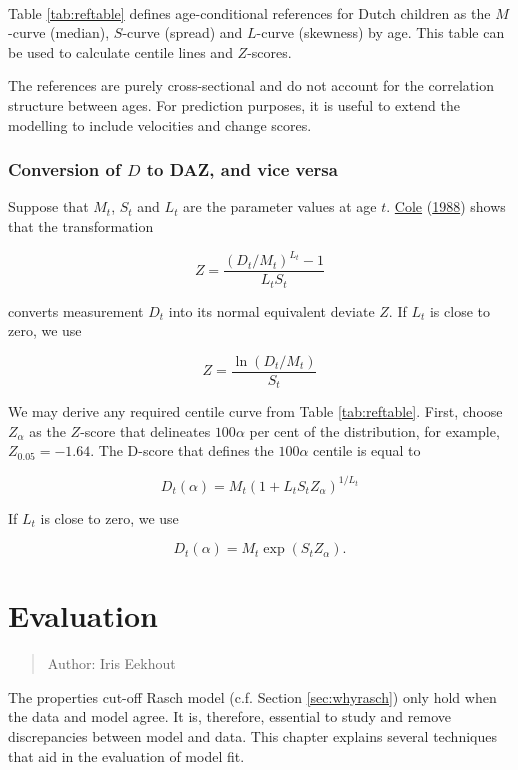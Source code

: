 \documentclass[
]{book}
\begin{document}
~

Table \ref{tab:reftable} defines age-conditional references for Dutch children as the \(M\)-curve (median), \(S\)-curve (spread) and \(L\)-curve (skewness) by age. This table can be used to calculate centile lines and \(Z\)-scores.

The references are purely cross-sectional and do not account for the correlation structure between ages. For prediction purposes, it is useful to extend the modelling to include velocities and change scores.

\hypertarget{conversion-of-d-to-daz-and-vice-versa}{%
\subsection{\texorpdfstring{Conversion of \(D\) to DAZ, and vice versa}{Conversion of D to DAZ, and vice versa}}\label{conversion-of-d-to-daz-and-vice-versa}}

Suppose that \(M_t\), \(S_t\) and \(L_t\) are the parameter values at age \(t\). \protect\hyperlink{ref-cole1988}{Cole} (\protect\hyperlink{ref-cole1988}{1988}) shows that the transformation

\[Z=\frac{(D_t/M_t)^{L_t}-1}{L_t S_t}\]

converts measurement \(D_t\) into its normal equivalent deviate \(Z\). If \(L_t\) is close to zero, we use

\[Z=\frac{\ln(D_t/M_t)}{S_t}\]

We may derive any required centile curve from Table \ref{tab:reftable}. First, choose \(Z_\alpha\) as the \(Z\)-score that delineates \(100\alpha\) per cent of the distribution, for example, ~\(Z_{0.05}=-1.64\). The D-score that defines the \(100\alpha\) centile is equal to

\[D_t(\alpha) = M_t (1+L_t S_t Z_\alpha)^{1/L_t}\]

If \(L_t\) is close to zero, we use

\[D_t(\alpha)= M_t \exp(S_t Z_\alpha).\]

\hypertarget{ch:evaluation}{%
\chapter{Evaluation}\label{ch:evaluation}}

\begin{quote}
Author: Iris Eekhout
\end{quote}

The properties cut-off Rasch model (c.f. Section \ref{sec:whyrasch}) only hold when the data and model agree. It is, therefore, essential to study and remove discrepancies between model and data. This chapter explains several techniques that aid in the evaluation of model fit.
\end{document}
